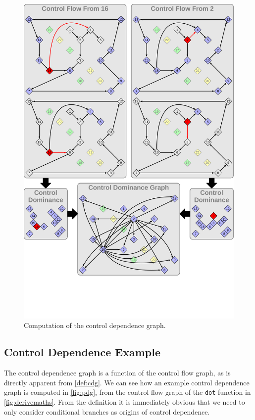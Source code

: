 \begin{figure}[p]
    \centering
    \includegraphics[width=\textwidth,height=1.5\textwidth]{figures/schaubild2.pdf}

    \vspace{27.38136pt}
    \caption{Computation of the control dependence graph.}
    \label{fig:pdg}
\end{figure}

\subsection{Control Dependence Example}

    The control dependence graph is a function of the control flow graph, as is
    directly apparent from \autoref{def:cdg}.
    We can see how an example control dependence graph is computed in
    \autoref{fig:pdg}, from the control flow graph of the \texttt{dot} function
    in \autoref{fig:derivemaths}.
    From the definition it is immediately obvious that we need to only consider
    conditional branches as origins of control dependence.

